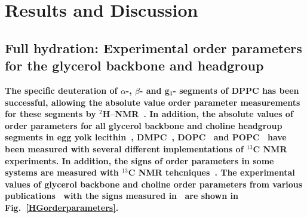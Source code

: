 \documentclass[pre,aps,floatfix,authordate1-4,twocolumn]{revtex4-1}
\begin{document}

 





\section{Results and Discussion}

\subsection{Full hydration: Experimental order parameters for the glycerol backbone and headgroup}\label{experiments}
{\bf The specific deuteration of $\alpha$-, $\beta$- and g$_3$- segments of DPPC has been successful, 
allowing the absolute value order parameter measurements for these segments by $^2$H--NMR~\cite{gally75,brown77,brown78,akutsu81}.
In addition, the absolute values of order parameters for all glycerol backbone and choline headgroup segments in egg yolk lecithin~\cite{hong95a},
DMPC~\cite{hong95b,gross97,dvinskikh05a}, DOPC~\cite{warschawski05} and POPC~\cite{warschawski05,ferreira13}
have been measured with several different implementations of $^{13}$C NMR experiments. In addition, the signs of order parameters in some systems
are measured with $^{13}$C NMR tehcniques~\cite{hong95a,hong95b,gross97}. The experimental values of glycerol backbone 
and choline order parameters from various publications~\cite{gally75,akutsu81,gross97,dvinskikh05a,ferreira13} with the signs measured in~\cite{hong95a,hong95b,gross97} are shown in Fig.~\ref{HGorderparameters}.
}
\end{document}
